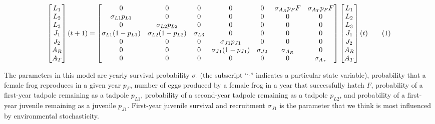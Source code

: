 \documentclass[9pt,twocolumn,twoside,lineno]{pnas-new}
\begin{document}
{\begin{figure}\[
\begin{bmatrix}
L_1 \\
L_2 \\
L_3 \\
J_1 \\
J_2 \\
A_R \\ 
A_T
\end{bmatrix}(t + 1) = 
\begin{bmatrix}
  0 & 0 & 0 & 0 & 0 & \sigma_{A_R} p_F F & \sigma_{A_T} p_F F \\
  \sigma_{L1} p_{L1} & 0 & 0 & 0 & 0 & 0 & 0 \\
  0 & \sigma_{L2} p_{L2} & 0 & 0 & 0 & 0 & 0\\
  \sigma_{L1} (1 - p_{L1}) & \sigma_{L2} (1 - p_{L2}) & \sigma_{L3} & 0 & 0 & 0 & 0 \\
  0 & 0 & 0 & \sigma_{J1} p_{J1} & 0 & 0 & 0 \\
  0 & 0 & 0 & \sigma_{J1} (1 - p_{J1}) & \sigma_{J2}  & \sigma_{A_R} & 0 \\
  0 & 0 & 0 & 0 & 0 & 0 & \sigma_{A_T} 
\end{bmatrix} \begin{bmatrix}
L_1 \\
L_2 \\
L_3 \\
J_1 \\
J_2 \\
A_R \\
A_T \\
\end{bmatrix}(t)\numberthis \label{eqn:matrix} 
\]\end{figure}

The parameters in this model are yearly survival probability
\(\sigma_{\cdot}\) (the subscript ``\(\cdot\)'' indicates a particular
state variable), probability that a female frog reproduces in a given
year \(p_F\), number of eggs produced by a female frog in a year that
successfully hatch \(F\), probability of a first-year tadpole remaining
as a tadpole \(p_{L1}\), probability of a second-year tadpole remaining
as a tadpole \(p_{L2}\), and probability of a first-year juvenile
remaining as a juvenile \(p_{J1}\). First-year juvenile survival and
recruitment \(\sigma_{J1}\) is the parameter that we think is most
influenced by environmental stochasticity.

}
\end{document}
